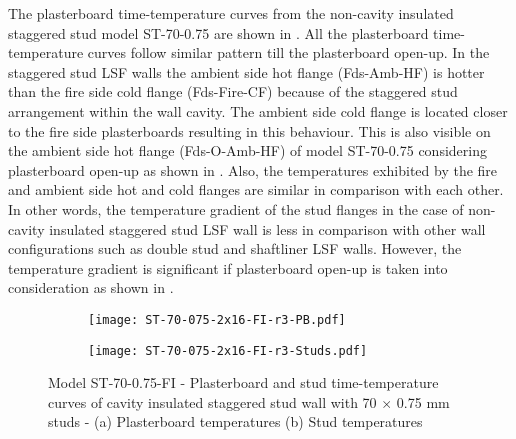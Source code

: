 The plasterboard time-temperature curves from the non-cavity insulated staggered stud model ST-70-0.75 are shown in . All the plasterboard time-temperature curves follow similar pattern till the plasterboard open-up. In the staggered stud LSF walls the ambient side hot flange (Fds-Amb-HF) is hotter than the fire side cold flange (Fds-Fire-CF) because of the staggered stud arrangement within the wall cavity. The ambient side cold flange is located closer to the fire side plasterboards resulting in this behaviour. This is also visible on the ambient side hot flange (Fds-O-Amb-HF) of model ST-70-0.75 considering plasterboard open-up as shown in . Also, the temperatures exhibited by the fire and ambient side hot and cold flanges are similar in comparison with each other. In other words, the temperature gradient of the stud flanges in the case of non-cavity insulated staggered stud LSF wall is less in comparison with other wall configurations such as double stud and shaftliner LSF walls. However, the temperature gradient is significant if plasterboard open-up is taken into consideration as shown in .   
\begin{figure}[!htbp]
	\centering
	\begin{subfigure}[b]{0.6\textwidth}
		\centering
		\texttt{[image: ST-70-075-2x16-FI-r3-PB.pdf]}
		\caption{}
		\label{subfig:ST-70-075-2x16-FI-r3-PB}
	\end{subfigure}
	\begin{subfigure}[b]{0.6\textwidth}
		\centering
		\texttt{[image: ST-70-075-2x16-FI-r3-Studs.pdf]}
		\caption{}
		\label{subfig:ST-70-075-2x16-FI-r3-Studs}
	\end{subfigure}
	   \caption{Model ST-70-0.75-FI - Plasterboard and stud time-temperature curves of cavity insulated staggered stud wall with 70 $\times$ 0.75 mm studs - (a) Plasterboard temperatures (b) Stud temperatures}
	   \label{fig:ST-70-075-2x16-FI-r3}
\end{figure}

